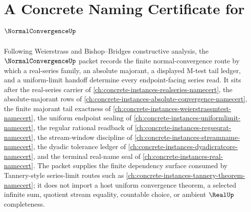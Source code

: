 \chapter{A Concrete Naming Certificate for $\NormalConvergenceUp$}
\label{ch:concrete-instances-normal-convergence-namecert}

Following Weierstrass and Bishop--Bridges constructive analysis, the $\NormalConvergenceUp$ packet records the finite normal-convergence route by which a real-series family, an absolute majorant, a displayed M-test tail ledger, and a uniform-limit handoff determine every endpoint-facing series read. It sits after the real-series carrier of \autoref{ch:concrete-instances-realseries-namecert}, the absolute-majorant rows of \autoref{ch:concrete-instances-absolute-convergence-namecert}, the finite majorant tail exactness of \autoref{ch:concrete-instances-weierstrassmtest-namecert}, the uniform endpoint sealing of \autoref{ch:concrete-instances-uniformlimit-namecert}, the regular rational readback of \autoref{ch:concrete-instances-regseqrat-namecert}, the stream-window discipline of \autoref{ch:concrete-instances-streamname-namecert}, the dyadic tolerance ledger of \autoref{ch:concrete-instances-dyadicratcore-namecert}, and the terminal real-name seal of \autoref{ch:concrete-instances-real-namecert}. The packet supplies the finite dependency surface consumed by Tannery-style series-limit routes such as \autoref{ch:concrete-instances-tannery-theorem-namecert}; it does not import a host uniform convergence theorem, a selected infinite sum, quotient stream equality, countable choice, or ambient $\RealUp$ completeness.

